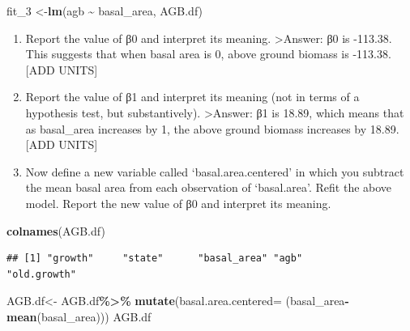 \documentclass[
]{article}
\newenvironment{Shaded}{\begin{snugshade}}{\end{snugshade}}
\newcommand{\AttributeTok}[1]{\textcolor[rgb]{0.13,0.29,0.53}{#1}}
\newcommand{\FunctionTok}[1]{\textcolor[rgb]{0.13,0.29,0.53}{\textbf{#1}}}
\newcommand{\NormalTok}[1]{#1}
\newcommand{\OtherTok}[1]{\textcolor[rgb]{0.56,0.35,0.01}{#1}}
\newcommand{\SpecialCharTok}[1]{\textcolor[rgb]{0.81,0.36,0.00}{\textbf{#1}}}
\begin{document}
\begin{Shaded}
\begin{Highlighting}[]
\NormalTok{fit\_3 }\OtherTok{\textless{}{-}}\FunctionTok{lm}\NormalTok{(agb }\SpecialCharTok{\textasciitilde{}}\NormalTok{ basal\_area, AGB.df)}
\end{Highlighting}
\end{Shaded}

\begin{enumerate}
\def\labelenumi{\alph{enumi}.}
\item
  Report the value of β0 and interpret its meaning. \textgreater Answer:
  β0 is -113.38. This suggests that when basal area is 0, above ground
  biomass is -113.38. {[}ADD UNITS{]}
\item
  Report the value of β1 and interpret its meaning (not in terms of a
  hypothesis test, but substantively). \textgreater Answer: β1 is 18.89,
  which means that as basal\_area increases by 1, the above ground
  biomass increases by 18.89. {[}ADD UNITS{]}
\item
  Now define a new variable called `basal.area.centered' in which you
  subtract the mean basal area from each observation of `basal.area'.
  Refit the above model. Report the new value of β0 and interpret its
  meaning.
\end{enumerate}

\begin{Shaded}
\begin{Highlighting}[]
\FunctionTok{colnames}\NormalTok{(AGB.df)}
\end{Highlighting}
\end{Shaded}

\begin{verbatim}
## [1] "growth"     "state"      "basal_area" "agb"        "old.growth"
\end{verbatim}

\begin{Shaded}
\begin{Highlighting}[]
\NormalTok{AGB.df}\OtherTok{\textless{}{-}}\NormalTok{ AGB.df}\SpecialCharTok{\%\textgreater{}\%}
  \FunctionTok{mutate}\NormalTok{(}\AttributeTok{basal.area.centered=}\NormalTok{ (basal\_area}\SpecialCharTok{{-}}\FunctionTok{mean}\NormalTok{(basal\_area)))}
\NormalTok{AGB.df}
\end{Highlighting}
\end{Shaded}
\end{document}
